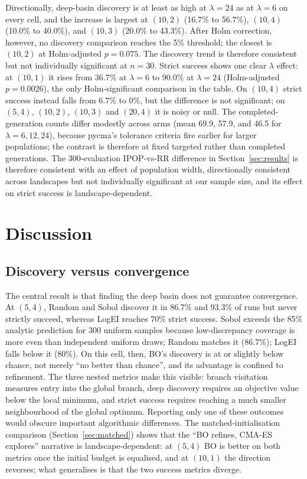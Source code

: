 \documentclass[11pt,a4paper]{article}
\begin{document}
Directionally, deep-basin discovery is at least as high at $\lambda=24$ as at $\lambda=6$ on every cell, and the increase is largest at $(10,2)$ (16.7\% to 56.7\%), $(10,4)$ (10.0\% to 40.0\%), and $(10,3)$ (20.0\% to 43.3\%). After Holm correction, however, no discovery comparison reaches the 5\% threshold; the closest is $(10,2)$ at Holm-adjusted $p=0.075$. The discovery trend is therefore consistent but not individually significant at $n=30$. Strict success shows one clear $\lambda$ effect: at $(10,1)$ it rises from 36.7\% at $\lambda=6$ to 90.0\% at $\lambda=24$ (Holm-adjusted $p=0.0026$), the only Holm-significant comparison in the table. On $(10,4)$ strict success instead falls from 6.7\% to 0\%, but the difference is not significant; on $(5,4)$, $(10,2)$, $(10,3)$ and $(20,4)$ it is noisy or null. The completed-generation counts differ modestly across arms (mean 69.9, 57.9, and 46.5 for $\lambda=6,12,24$), because pycma's tolerance criteria fire earlier for larger populations; the contrast is therefore at fixed targeted rather than completed generations. The 300-evaluation IPOP-vs-RR difference in Section~\ref{sec:results} is therefore consistent with an effect of population width, directionally consistent across landscapes but not individually significant at our sample size, and its effect on strict success is landscape-dependent.

\section{Discussion}\label{sec:discussion}

\subsection{Discovery versus convergence}
The central result is that finding the deep basin does not guarantee convergence. At $(5,4)$, Random and Sobol discover it in 86.7\% and 93.3\% of runs but never strictly succeed, whereas LogEI reaches 70\% strict success. Sobol exceeds the 85\% analytic prediction for 300 uniform samples because low-discrepancy coverage is more even than independent uniform draws; Random matches it (86.7\%); LogEI falls below it (80\%). On this cell, then, BO's discovery is at or slightly below chance, not merely ``no better than chance'', and its advantage is confined to refinement. The three nested metrics make this visible: branch visitation measures entry into the global branch, deep discovery requires an objective value below the local minimum, and strict success requires reaching a much smaller neighbourhood of the global optimum. Reporting only one of these outcomes would obscure important algorithmic differences. The matched-initialisation comparison (Section~\ref{sec:matched}) shows that the ``BO refines, CMA-ES explores'' narrative is landscape-dependent: at $(5,4)$ BO is better on both metrics once the initial budget is equalised, and at $(10,1)$ the direction reverses; what generalises is that the two success metrics diverge.
\end{document}
